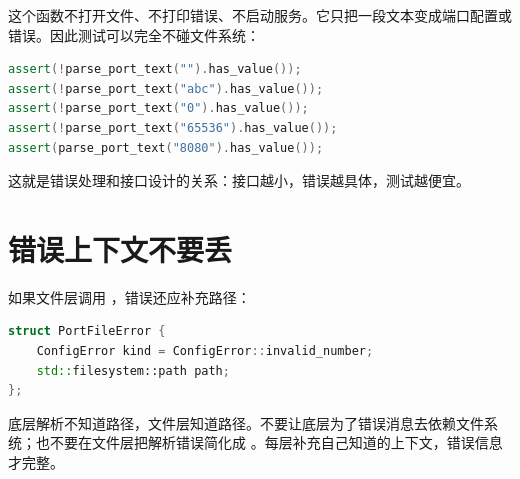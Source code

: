 这个函数不打开文件、不打印错误、不启动服务。它只把一段文本变成端口配置或错误。因此测试可以完全不碰文件系统：

\begin{lstlisting}[language=C++,caption={端口文本测试样本}]
assert(!parse_port_text("").has_value());
assert(!parse_port_text("abc").has_value());
assert(!parse_port_text("0").has_value());
assert(!parse_port_text("65536").has_value());
assert(parse_port_text("8080").has_value());
\end{lstlisting}

这就是错误处理和接口设计的关系：接口越小，错误越具体，测试越便宜。

\section{错误上下文不要丢}

如果文件层调用 ，错误还应补充路径：

\begin{lstlisting}[language=C++,caption={文件层补充上下文}]
struct PortFileError {
    ConfigError kind = ConfigError::invalid_number;
    std::filesystem::path path;
};
\end{lstlisting}

底层解析不知道路径，文件层知道路径。不要让底层为了错误消息去依赖文件系统；也不要在文件层把解析错误简化成 。每层补充自己知道的上下文，错误信息才完整。
